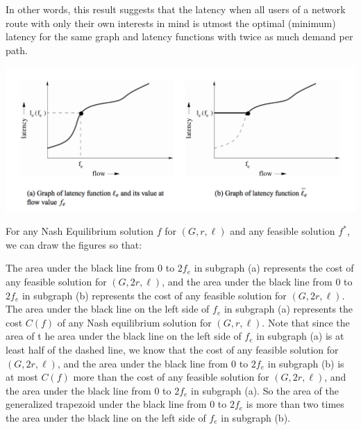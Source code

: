 \begin{proof-sketch}
    In other words, this result suggests that the latency when all users of a network route with only their own interests in mind is utmost the optimal (minimum) latency for the same graph and latency functions
    with twice as much demand per path. 
    
    \includegraphics[width=1\textwidth]{graph}

    For any Nash Equilibrium solution $f$ for $(G, r, \ell)$ and any feasible solution $f^*$, we can draw the figures so that:
    
    The area under the black line from $0$ to $2f_e$ in subgraph (a) represents the cost of any feasible solution for $(G, 2r, \ell)$, and the area under the black line from $0$ to $2f_e$ in subgraph (b) represents the cost of any feasible solution for $(G, 2r, \ell)$. The area under the black line on the left side of $f_e$ in subgraph (a) represents the cost $C(f)$ of any Nash equilibrium solution for $(G, r, \ell)$. Note that since the area of t he area under the black line on the left side of $f_e$ in subgraph (a) is at least half of the dashed line, we know that the cost of any feasible solution for $(G, 2r, \ell)$, and the area under the black line from $0$ to $2f_e$ in subgraph (b) is at most $C(f)$ more than the cost of any feasible solution for $(G, 2r, \ell)$, and the area under the black line from $0$ to $2f_e$ in subgraph (a). So the area of the generalized trapezoid under the black line from $0$ to $2f_e$ is more than two times the area under the black line on the left side of $f_e$ in subgraph (b).
    

\end{proof-sketch}
